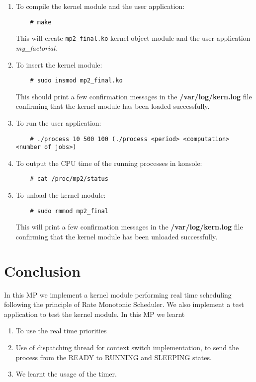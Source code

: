 \documentclass[11pt]{article}
\begin{document}
\begin{enumerate}
	\item To compile the kernel module and the user application:
	\begin{verbatim}
	# make
	\end{verbatim}
	This will create {\tt mp2\_final.ko} kernel object module and the user application {\em my\_factorial}.
	\item To insert the kernel module:
	\begin{verbatim}
	# sudo insmod mp2_final.ko
	\end{verbatim}
	This should print a few confirmation messages in the {\bf /var/log/kern.log} file confirming that the kernel module has been loaded successfully.
	\item To run the user application:
	\begin{verbatim}
	# ./process 10 500 100 (./process <period> <computation> <number of jobs>)
	\end{verbatim}
	\item To output the CPU time of the running processes in konsole:
	\begin{verbatim}
	# cat /proc/mp2/status
	\end{verbatim}
	\item To unload the kernel module:
	\begin{verbatim}
	# sudo rmmod mp2_final
	\end{verbatim}
	This will print a few confirmation messages in the {\bf /var/log/kern.log} file confirming that the kernel module has been unloaded successfully.
\end{enumerate}


\section{Conclusion}\label{sec:Conclude}

In this MP we implement a kernel module performing real time scheduling following the principle of Rate Monotonic Scheduler. We also implement a test application to test the kernel module. In this MP we learnt
\begin{enumerate}
	\item To use the real time priorities
	\item Use of dispatching thread for context switch implementation, to send the process from the READY to RUNNING and SLEEPING states.
	\item We learnt the usage of the timer.
\end{enumerate}
\end{document}
